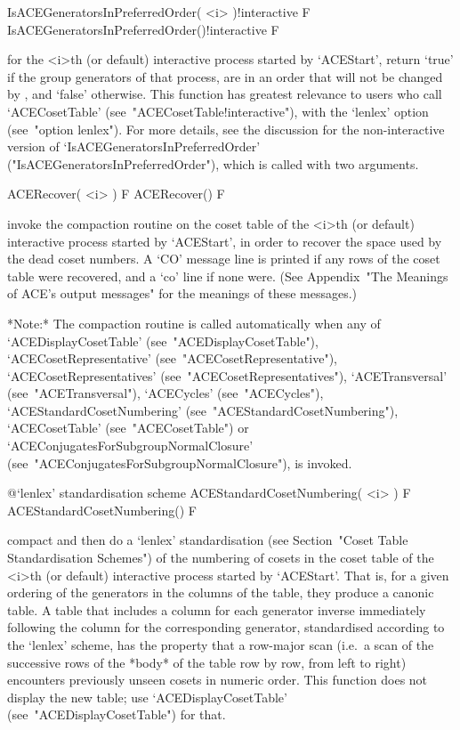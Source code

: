 \>IsACEGeneratorsInPreferredOrder( <i> )!{interactive} F
\>IsACEGeneratorsInPreferredOrder()!{interactive} F

for the <i>th (or  default)  interactive  {\ACE}  process  started  by
`ACEStart', return `true' if the group generators of that process, are
in an order that will not be changed by {\ACE}, and `false' otherwise.
This function has greatest relevance to users who call `ACECosetTable'
(see~"ACECosetTable!interactive"),   with    the    `lenlex'    option
(see~"option lenlex"). For more details, see the  discussion  for  the
non-interactive    version    of     `IsACEGeneratorsInPreferredOrder'
("IsACEGeneratorsInPreferredOrder"),  which   is   called   with   two
arguments.


\>ACERecover( <i> ) F
\>ACERecover() F

invoke the compaction routine on the coset  table  of  the  <i>th  (or
default) interactive {\ACE} process started by `ACEStart', in order to
recover the space used by the dead coset numbers. A `CO' message  line
is printed if any rows of the coset table were recovered, and  a  `co'
line if  none  were.  (See  Appendix~"The  Meanings  of  ACE's  output
messages" for the meanings of these messages.)

*Note:*
The  compaction  routine  is  called   automatically   when   any   of
`ACEDisplayCosetTable'                   (see~"ACEDisplayCosetTable"),
`ACECosetRepresentative'               (see~"ACECosetRepresentative"),
`ACECosetRepresentatives'             (see~"ACECosetRepresentatives"),
`ACETransversal'          (see~"ACETransversal"),          `ACECycles'
(see~"ACECycles"),                         `ACEStandardCosetNumbering'
(see~"ACEStandardCosetNumbering"),                     `ACECosetTable'
(see~"ACECosetTable")    or    `ACEConjugatesForSubgroupNormalClosure'
(see~"ACEConjugatesForSubgroupNormalClosure"), is invoked.

%
{@\noexpand`lenlex' standardisation scheme}
\>ACEStandardCosetNumbering( <i> ) F
\>ACEStandardCosetNumbering() F

compact and then do a  `lenlex'  standardisation  (see  Section~"Coset
Table Standardisation Schemes") of the  numbering  of  cosets  in  the
coset table of the  <i>th  (or  default)  interactive  {\ACE}  process
started by `ACEStart'. That is, for a given ordering of the generators
in the columns of the table, they produce a  canonic  table.  A  table
that  includes  a  column  for  each  generator  inverse   immediately
following the column for  the  corresponding  generator,  standardised
according to the `lenlex' scheme, has the property  that  a  row-major
scan (i.e.~a scan of the successive rows of the *body*  of  the  table
row by row, from left to right) encounters previously unseen cosets in
numeric order. This function does  not  display  the  new  table;  use
`ACEDisplayCosetTable' (see~"ACEDisplayCosetTable") for that.

